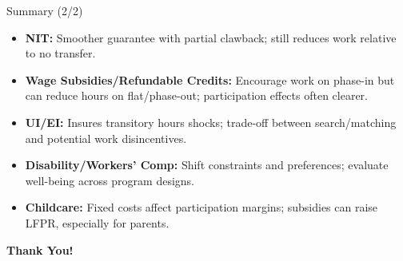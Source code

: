 \documentclass[aspectratio=169]{beamer}
\begin{document}
\begin{frame}{Summary (2/2)}
\transfade
\begin{itemize}[<+->]
  \item \textbf{NIT:} Smoother guarantee with partial clawback; still reduces work relative to no transfer.
  \item \textbf{Wage Subsidies/Refundable Credits:} Encourage work on phase-in but can reduce hours on flat/phase-out; participation effects often clearer.
  \item \textbf{UI/EI:} Insures transitory hours shocks; trade-off between search/matching and potential work disincentives.
  \item \textbf{Disability/Workers’ Comp:} Shift constraints and preferences; evaluate well-being across program designs.
  \item \textbf{Childcare:} Fixed costs affect participation margins; subsidies can raise LFPR, especially for parents.
\end{itemize}
\end{frame}

\begin{frame}
\centering
\Huge{\textbf{Thank You!}} \\

\end{frame}
\end{document}
